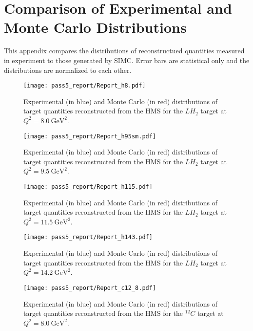 \chapter{Comparison of Experimental and Monte Carlo Distributions} \label{app:distributions}
This appendix compares the distributions of reconstructued quantities measured in experiment
to those generated by SIMC.
Error bars are statistical only and the distributions are normalized to each other.
\begin{figure}[!h]
    \centering
    \texttt{[image: pass5\_report/Report\_h8.pdf]}
    \caption{
            Experimental (in blue) and Monte Carlo (in red) distributions of
            target quantities reconstructed from the HMS for
            the $LH_2$ target at $Q^2=\SI{8.0}{\giga\electronvolt\squared}$.
            }
    \label{fig:Report_h8.pdf}
\end{figure}


\begin{figure}[!h]
    \centering
    \texttt{[image: pass5\_report/Report\_h95sm.pdf]}
    \caption{
            Experimental (in blue) and Monte Carlo (in red) distributions of
            target quantities reconstructed from the HMS for
            the $LH_2$ target at $Q^2=\SI{9.5}{\giga\electronvolt\squared}$.
            }
    \label{fig:Report_h95sm.pdf}
\end{figure}


\begin{figure}[!h]
    \centering
    \texttt{[image: pass5\_report/Report\_h115.pdf]}
    \caption{
            Experimental (in blue) and Monte Carlo (in red) distributions of
            target quantities reconstructed from the HMS for
            the $LH_2$ target at $Q^2=\SI{11.5}{\giga\electronvolt\squared}$.
            }
    \label{fig:Report_h115.pdf}
\end{figure}


\begin{figure}[!h]
    \centering
    \texttt{[image: pass5\_report/Report\_h143.pdf]}
    \caption{
            Experimental (in blue) and Monte Carlo (in red) distributions of
            target quantities reconstructed from the HMS for
            the $LH_2$ target at $Q^2=\SI{14.2}{\giga\electronvolt\squared}$.
            }
    \label{fig:Report_h143.pdf}
\end{figure}


\begin{figure}[!h]
    \centering
    \texttt{[image: pass5\_report/Report\_c12\_8.pdf]}
    \caption{
            Experimental (in blue) and Monte Carlo (in red) distributions of
            target quantities reconstructed from the HMS for
            the ${}^{12}C$ target at $Q^2=\SI{8.0}{\giga\electronvolt\squared}$.
            }
    \label{fig:Report_c12_8.pdf}
\end{figure}



